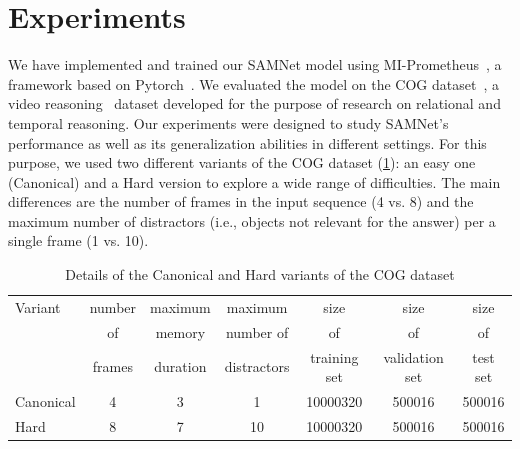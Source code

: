 \section{Experiments}

We have implemented and trained our SAMNet model using MI-Prometheus~\cite{kornuta2018accelerating}, a framework based on Pytorch~\cite{paszke2017automatic}. 
We evaluated the model on the COG dataset~\cite{yang2018dataset}, a video reasoning~\cite{mogadala2019trends} dataset developed for the purpose of research on relational and temporal reasoning.
Our experiments were designed to study SAMNet's performance as well as its generalization abilities in different settings.
For this purpose, we used two different variants of the COG dataset (\cref{tab:cog_variants}): an easy one (Canonical) and a Hard version to explore a wide range of difficulties.
The main differences are the number of frames in the input sequence (4 vs. 8) and the maximum number of distractors (i.e., objects not relevant for the answer) per a single frame (1 vs. 10).


\begin{table}[htb]
\caption{Details of the Canonical and Hard variants of the COG dataset}
\centering
\begin{tabular}{lcccccc}
	\toprule
	Variant    &  	number &  	maximum & maximum & size & size & size  \\ 
	& of   & memory & number of & of & of & of  \\
	& frames & duration & distractors & training set & validation set & test set \\
	\midrule
	Canonical & 4 & 3 & 1 & 10000320 & 500016 & 500016 \\	
	Hard  & 8 & 7 & 10 & 10000320 & 500016  & 500016 \\
	\bottomrule	
\end{tabular}
\label{tab:cog_variants}
\end{table}




%
%

